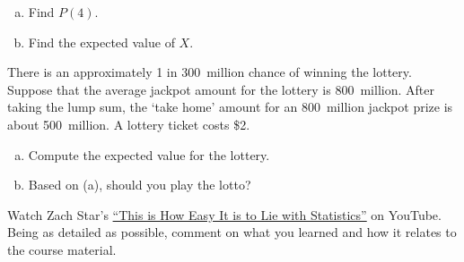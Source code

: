 \documentclass[11pt,letterpaper]{article}
\begin{document}
\begin{enumerate}[(a)]
\item Find $P(4)$.
\item Find the expected value of $X$. 
\end{enumerate}



\newpage



 There is an approximately 1 in 300~million chance of winning the lottery. Suppose that the average jackpot amount for the lottery is 800~million. After taking the lump sum, the `take home' amount for an 800~million jackpot prize is about 500~million. A lottery ticket costs \$2. 
	\begin{enumerate}[(a)]
	\item Compute the expected value for the lottery. 
	\item Based on (a), should you play the lotto? 
	\end{enumerate}



\newpage



 Watch Zach Star's \href{https://www.youtube.com/watch?v=bVG2OQp6jEQ&t=933s&pp=ygUtVGhpcyBpcyBIb3cgRWFzeSBJdCBpcyB0byBMaWUgd2l0aCBTdGF0aXN0aWNz}{``This is How Easy It is to Lie with Statistics''} on YouTube. Being as detailed as possible, comment on what you learned and how it relates to the course material. 
\end{document}
